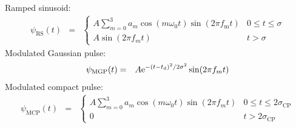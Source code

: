 \documentclass[onecolumn,a4paper]{article}
\numberwithin{equation}{section}
\begin{document}
Ramped sinusoid:
\begin{eqnarray} 
\psi_\mathrm{RS}(t) &=& \left\{  
\begin{array}{ll} 
A\sum_{m=0}^3 a_m \cos ( m \omega_0 t) \sin(2\pi f_\mathrm{m} t)   &0 \le t \le \sigma \\
A\sin(2\pi f_m t)                                          &t> \sigma
\end{array}
\right.
\end{eqnarray}
Modulated Gaussian pulse:
\begin{eqnarray}
\psi_\mathrm{MGP}(t) &=& A \mathrm{e}^{-( t - t_\mathrm{d} )^2/2 \sigma^2} \sin(2\pi f_m t)
\end{eqnarray}
Modulated compact pulse:
\begin{eqnarray}
\psi_\mathrm{MCP}(t) &=& \left\{  
\begin{array}{ll} 
A\sum_{m=0}^3 a_m \cos ( m \omega_0 t) \sin(2\pi f_m t)   &0 \le t \le 2\sigma_{\mathrm{CP}} \\
0                                                       &t> 2\sigma_{\mathrm{CP}}
\end{array}
\right.
\end{eqnarray}
\end{document}

